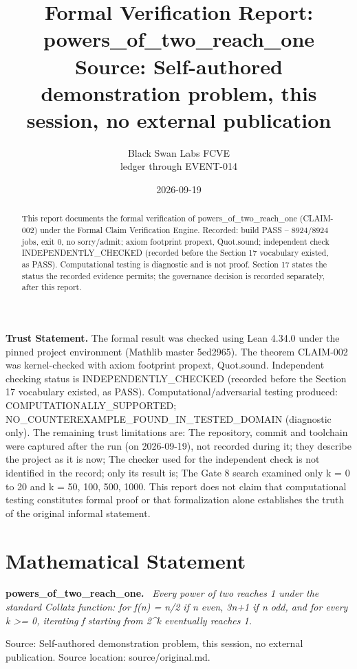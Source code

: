 \documentclass[11pt]{article}
\title{Formal Verification Report: powers\_of\_two\_reach\_one\\[0.5em]{\large Source: Self-authored demonstration problem, this session, no external publication}}
\author{Black Swan Labs FCVE \\ ledger through EVENT-014}
\date{2026-09-19}
\newenvironment{sourceresult}[1]{\par\medskip\noindent\textbf{#1.}\ \itshape}{\par\medskip}
\begin{document}
\maketitle

\noindent\textbf{Trust Statement.} The formal result was checked using Lean 4.34.0 under the pinned project environment (Mathlib master 5ed2965). The theorem CLAIM-002 was kernel-checked with axiom footprint propext, Quot.sound. Independent checking status is INDEPENDENTLY\_CHECKED (recorded before the Section 17 vocabulary existed, as PASS). Computational/adversarial testing produced: COMPUTATIONALLY\_SUPPORTED; NO\_COUNTEREXAMPLE\_FOUND\_IN\_TESTED\_DOMAIN (diagnostic only). The remaining trust limitations are: The repository, commit and toolchain were captured after the run (on 2026-09-19), not recorded during it; they describe the project as it is now; The checker used for the independent check is not identified in the record; only its result is; The Gate 8 search examined only k = 0 to 20 and k = 50, 100, 500, 1000. This report does not claim that computational testing constitutes formal proof or that formalization alone establishes the truth of the original informal statement.

\begin{abstract}
This report documents the formal verification of powers\_of\_two\_reach\_one (CLAIM-002) under the Formal Claim Verification Engine. Recorded: build PASS -- 8924/8924 jobs, exit 0, no sorry/admit; axiom footprint propext, Quot.sound; independent check INDEPENDENTLY\_CHECKED (recorded before the Section 17 vocabulary existed, as PASS). Computational testing is diagnostic and is not proof. Section 17 states the status the recorded evidence permits; the governance decision is recorded separately, after this report.
\end{abstract}

\section{Mathematical Statement}
\begin{sourceresult}{powers\_of\_two\_reach\_one}
Every power of two reaches 1 under the standard Collatz function: for f(n) = n/2 if n even, 3n+1 if n odd, and for every k >= 0, iterating f starting from 2\textasciicircum{}k eventually reaches 1.
\end{sourceresult}
Source: Self-authored demonstration problem, this session, no external publication. Source location: source/original.md.
\end{document}
